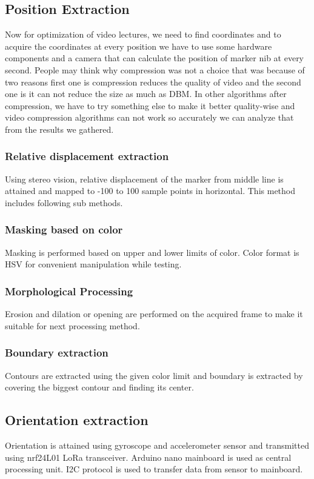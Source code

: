 \documentclass[conference]{IEEEtran}
\begin{document}
\subsection{Position Extraction}
Now for optimization of video lectures, we need to find coordinates and to acquire the coordinates at every position we have to use some hardware components and a camera that can calculate the position of marker nib at every second. People may think why compression was not a choice that was because of two reasons first one is compression reduces the quality of video and the second one is it can not reduce the size as much as DBM. In other algorithms after compression, we have to try something else to make it better quality-wise  and video compression algorithms can not work so accurately we can analyze that from the results we gathered\cite{b21}.
\subsubsection{Relative displacement extraction}
Using stereo vision, relative displacement of the marker from middle line is attained and mapped to 
-100 to 100 sample points in horizontal. This method includes following sub methods.
\subsubsection{Masking based on color}
Masking is performed based on upper and lower limits of color. Color format is HSV for convenient manipulation while testing.
\subsubsection{Morphological Processing}
Erosion and dilation or opening are performed on the acquired frame to make it suitable for next processing method.
\subsubsection{Boundary extraction}
Contours are extracted using the given color limit and boundary is extracted by covering the biggest contour and finding its center.
\subsection{Orientation extraction}
Orientation is attained using gyroscope and accelerometer sensor and transmitted using nrf24L01 LoRa transceiver. Arduino nano mainboard is used as central processing unit. I2C protocol is used to transfer data from sensor to mainboard.
\end{document}
